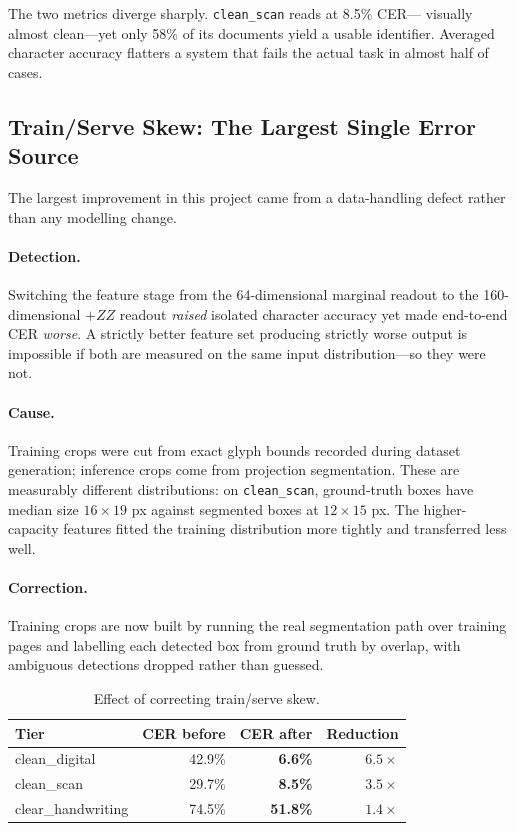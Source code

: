 \documentclass[11pt,a4paper]{article}
\begin{document}
The two metrics diverge sharply. \texttt{clean\_scan} reads at 8.5\% CER---
visually almost clean---yet only 58\% of its documents yield a usable identifier.
Averaged character accuracy flatters a system that fails the actual task in
almost half of cases.

\subsection{Train/Serve Skew: The Largest Single Error Source}

The largest improvement in this project came from a data-handling defect rather
than any modelling change.

\paragraph{Detection.} Switching the feature stage from the 64-dimensional
marginal readout to the 160-dimensional $+ZZ$ readout \emph{raised} isolated
character accuracy yet made end-to-end CER \emph{worse}. A strictly better
feature set producing strictly worse output is impossible if both are measured on
the same input distribution---so they were not.

\paragraph{Cause.} Training crops were cut from exact glyph bounds recorded
during dataset generation; inference crops come from projection segmentation.
These are measurably different distributions: on \texttt{clean\_scan},
ground-truth boxes have median size $16\times19$ px against segmented boxes at
$12\times15$ px. The higher-capacity features fitted the training distribution
more tightly and transferred less well.

\paragraph{Correction.} Training crops are now built by running the real
segmentation path over training pages and labelling each detected box from ground
truth by overlap, with ambiguous detections dropped rather than guessed.

\begin{table}[h]
\centering
\caption{Effect of correcting train/serve skew.}
\begin{tabular}{@{}lrrr@{}}
\toprule
Tier & CER before & CER after & Reduction \\
\midrule
clean\_digital & 42.9\% & \textbf{6.6\%} & $6.5\times$ \\
clean\_scan & 29.7\% & \textbf{8.5\%} & $3.5\times$ \\
clear\_handwriting & 74.5\% & \textbf{51.8\%} & $1.4\times$ \\
\bottomrule
\end{tabular}
\end{table}
\end{document}
